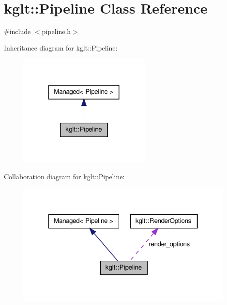 \hypertarget{classkglt_1_1_pipeline}{\section{kglt\-:\-:Pipeline Class Reference}
\label{classkglt_1_1_pipeline}
}


{\ttfamily \#include $<$pipeline.\-h$>$}



Inheritance diagram for kglt\-:\-:Pipeline\-:\nopagebreak
\begin{figure}[H]
\begin{center}
\leavevmode
\includegraphics[width=188pt]{classkglt_1_1_pipeline__inherit__graph}
\end{center}
\end{figure}


Collaboration diagram for kglt\-:\-:Pipeline\-:\nopagebreak
\begin{figure}[H]
\begin{center}
\leavevmode
\includegraphics[width=310pt]{classkglt_1_1_pipeline__coll__graph}
\end{center}
\end{figure}
